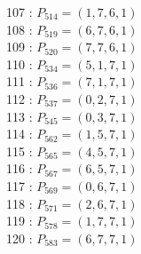 \documentclass{article}
\begin{document}
{\begin{multicols}{3}
107 : $P_{514}=( 1, 7, 6, 1 )$\\
108 : $P_{519}=( 6, 7, 6, 1 )$\\
109 : $P_{520}=( 7, 7, 6, 1 )$\\
110 : $P_{534}=( 5, 1, 7, 1 )$\\
111 : $P_{536}=( 7, 1, 7, 1 )$\\
112 : $P_{537}=( 0, 2, 7, 1 )$\\
113 : $P_{545}=( 0, 3, 7, 1 )$\\
114 : $P_{562}=( 1, 5, 7, 1 )$\\
115 : $P_{565}=( 4, 5, 7, 1 )$\\
116 : $P_{567}=( 6, 5, 7, 1 )$\\
117 : $P_{569}=( 0, 6, 7, 1 )$\\
118 : $P_{571}=( 2, 6, 7, 1 )$\\
119 : $P_{578}=( 1, 7, 7, 1 )$\\
120 : $P_{583}=( 6, 7, 7, 1 )$\\
\end{multicols}


%


%


}%
\end{document}
